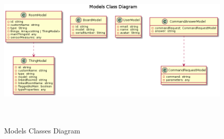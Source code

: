 \begin{figure}[hbt!]
\centering
\includegraphics[height=3in]{figures/diagrams/front/architecture/models.png}
\caption[models]{Models Classes Diagram\footnotemark}
\end{figure}

